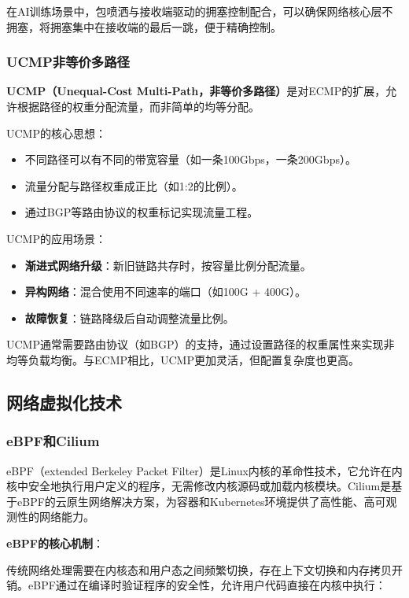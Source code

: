 在AI训练场景中，包喷洒与接收端驱动的拥塞控制配合，可以确保网络核心层不拥塞，将拥塞集中在接收端的最后一跳，便于精确控制。

\subsubsection{UCMP非等价多路径}

\textbf{UCMP（Unequal-Cost Multi-Path，非等价多路径）}是对ECMP的扩展，允许根据路径的权重分配流量，而非简单的均等分配。

UCMP的核心思想：
\begin{itemize}
    \item 不同路径可以有不同的带宽容量（如一条100Gbps，一条200Gbps）。
    \item 流量分配与路径权重成正比（如1:2的比例）。
    \item 通过BGP等路由协议的权重标记实现流量工程。
\end{itemize}

UCMP的应用场景：
\begin{itemize}
    \item \textbf{渐进式网络升级}：新旧链路共存时，按容量比例分配流量。
    \item \textbf{异构网络}：混合使用不同速率的端口（如100G + 400G）。
    \item \textbf{故障恢复}：链路降级后自动调整流量比例。
\end{itemize}

UCMP通常需要路由协议（如BGP）的支持，通过设置路径的权重属性来实现非均等负载均衡。与ECMP相比，UCMP更加灵活，但配置复杂度也更高。

\subsection{网络虚拟化技术}

\subsubsection{eBPF和Cilium}

eBPF（extended Berkeley Packet Filter）是Linux内核的革命性技术，它允许在内核中安全地执行用户定义的程序，无需修改内核源码或加载内核模块。Cilium是基于eBPF的云原生网络解决方案，为容器和Kubernetes环境提供了高性能、高可观测性的网络能力。

\textbf{eBPF的核心机制}：

传统网络处理需要在内核态和用户态之间频繁切换，存在上下文切换和内存拷贝开销。eBPF通过在编译时验证程序的安全性，允许用户代码直接在内核中执行：

